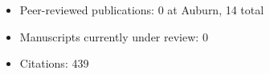 \begin{itemize}
    \item Peer-reviewed publications: 0 at Auburn, 14 total
    \item Manuscripts currently under review: 0
    \item Citations: 439
\end{itemize}
